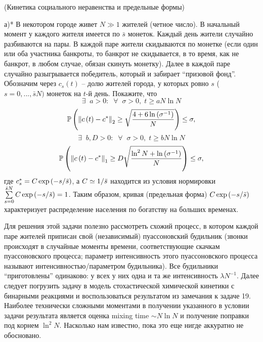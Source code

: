 \begin{problem} (Кинетика социального неравенства и предельные формы)
\label{soc_ineq}
$\quad$

 а)* В некотором городе живет $N\gg 1$ жителей (четное число). В начальный 
момент у каждого жителя имеется по $\bar {s}$ монеток. Каждый день жители 
случайно разбиваются на пары. В каждой паре жители скидываются по монетке 
(если один или оба участника банкроты, то банкрот не скидывается, в то 
время, как не банкрот, в любом случае, обязан скинуть монетку). Далее в 
каждой паре случайно разыгрывается победитель, который и забирает ``призовой 
фонд''. Обозначим через $c_s \left( t \right)$ -- долю жителей города, у 
которых  ровно $s$ ($s=0,...,\bar {s}N)$ монеток на $t$-й день. 
Покажите, что
\[
\exists \;\;a>0:\;\;\forall \;\;\sigma >0,\;t\ge aN\ln N 
\]
\[
\mathrm{{\mathbb P}}\left( {\left\| 
{c\left( t \right)-c^\ast } \right\|_2 \ge \sqrt {\frac{4+6\ln \left( 
{\sigma ^{-1}} \right)}{N}} } \right)\le \sigma ,
\]
\[
\exists \;\;b,D>0:\;\;\forall \;\;\sigma >0,\;t\ge bN\ln N 
\]
\[\mathrm{{\mathbb P}}\left( {\left\| 
{c\left( t \right)-c^\ast } \right\|_1 \ge D\sqrt {\frac{\ln ^2N+\ln \left( 
{\sigma ^{-1}} \right)}{N}} } \right)\le \sigma ,
\]
где $c_s^\ast =C\exp \left( {-s \mathord{\left/ {\vphantom {s {\bar {s}}}} 
\right. \kern-\nulldelimiterspace} {\bar {s}}} \right)$, а $C\simeq 1 
\mathord{\left/ {\vphantom {1 {\bar {s}}}} \right. 
\kern-\nulldelimiterspace} {\bar {s}}$ находится из условия нормировки 
$\sum\limits_{s=0}^{\bar {s}N} {C\exp \left( {-s \mathord{\left/ {\vphantom 
{s {\bar {s}}}} \right. \kern-\nulldelimiterspace} {\bar {s}}} \right)} =1$. 
Таким образом, кривая (предельная форма) $C\exp \left( {-s \mathord{\left/ 
{\vphantom {s {\bar {s}}}} \right. \kern-\nulldelimiterspace} {\bar {s}}} 
\right)$ характеризует распределение населения по богатству на больших 
временах.

\begin{ordre}
 Для решения этой задачи полезно рассмотреть схожий 
процесс, в котором каждой паре жителей приписан свой (независимый) 
пуассоновский будильник (звонки происходят в случайные моменты времени, 
соответствующие скачкам пуассоновского процесса; параметр интенсивность 
этого пуассоновского процесса называют интенсивностью/параметром 
будильника). Все будильники ``приготовлены'' одинаково: у всех у них одна и 
та же интенсивность $\lambda N^{-1}$. Далее следует погрузить задачу в 
модель стохастической химической кинетики с бинарными реакциями и 
воспользоваться результатом из замечания к задаче 19. Наиболее технически 
сложными моментами в получении указанного в условии задачи результата 
является оценка mixing time $\sim N\ln N$ и получение поправки под корнем 
$\ln ^2N$. Насколько нам известно, пока это еще нигде аккуратно не 
обосновано.
\end{ordre}


\end{problem}
